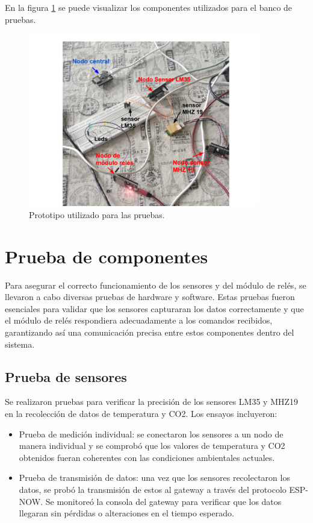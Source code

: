En la figura \ref{fig:banco_pruebas} se puede visualizar los componentes utilizados para el banco de pruebas. 

\begin{figure}[H]
\centering 
\includegraphics[width=0.9\textwidth]{./Figures/banco_pruebas.png}
\caption{Prototipo utilizado para las pruebas.}
\label{fig:banco_pruebas}
\end{figure}




\section{Prueba de componentes}

Para asegurar el correcto funcionamiento de los sensores y del módulo de relés, se llevaron a cabo diversas pruebas de hardware y software. Estas pruebas fueron esenciales para validar que los sensores capturaran los datos correctamente y que el módulo de relés respondiera adecuadamente a los comandos recibidos, garantizando así una comunicación precisa entre estos componentes dentro del sistema.

\subsection{Prueba de sensores}

Se realizaron pruebas para verificar la precisión de los sensores LM35 y MHZ19 en la recolección de datos de temperatura y CO2. Los ensayos incluyeron:

\begin{itemize}
	\item Prueba de medición individual: se conectaron los sensores a un nodo de manera individual y se comprobó que los valores de temperatura y CO2 obtenidos fueran coherentes con las condiciones ambientales actuales. 
	\item Prueba de transmisión de datos: una vez que los sensores recolectaron los datos, se probó la transmisión de estos al gateway a través del protocolo ESP-NOW. Se monitoreó la consola del gateway para verificar que los datos llegaran sin pérdidas o alteraciones en el tiempo esperado.
\end{itemize}

